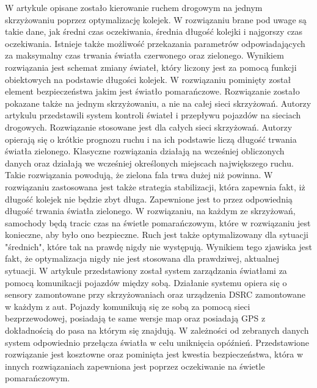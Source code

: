 \newline
\indent
W artykule \cite{de1998optimal} opisane zostało kierowanie ruchem drogowym na jednym skrzyżowaniu poprzez optymalizację kolejek. W rozwiązaniu brane pod uwage są takie dane, jak średni czas oczekiwania, średnia długość kolejki i najgorszy czas oczekiwania. Istnieje także możliwość przekazania parametrów odpowiadających za maksymalny czas trwania światła czerwonego oraz zielonego. Wynikiem rozwiązania jest schemat zmiany świateł, który liczony jest za pomocą funkcji obiektowych na podstawie długości kolejek. W rozwiązaniu pominięty został element bezpieczeństwa jakim jest światło pomarańczowe. Rozwiązanie zostało pokazane także na jednym skrzyżowaniu, a nie na całej sieci skrzyżowań.
\newline
\indent
  Autorzy artykulu \cite{lammer2008self} przedstawili system kontroli świateł i przepływu pojazdów na sieciach drogowych. Rozwiązanie stosowane jest dla całych sieci skrzyżowań. Autorzy opierają się o krótkie prognozu ruchu i na ich podstawie liczą długość trwania światła zielonego. Klasyczne rozwiązania działają na wcześniej obliczonych danych oraz działają we wcześniej określonych miejscach największego ruchu. Takie rozwiązania powodują, że zielona fala trwa dużej niż powinna. W rozwiązaniu zastosowana jest także strategia stabilizacji, która zapewnia fakt, iż długość kolejek nie będzie zbyt długa. Zapewnione jest to przez odpowiednią długość trwania światła zielonego. W rozwiązaniu, na każdym ze skrzyżowań, samochody będą tracic czas na świetle pomarańczowym, które w rozwiązaniu jest konieczne, aby było ono bezpieczne. Ruch jest także optymalizowany dla sytuacji "średnich", które tak na prawdę nigdy nie występują. Wynikiem tego zjawiska jest fakt, że optymalizacja nigdy nie jest stosowana dla prawdziwej, aktualnej sytuacji.
\newline
\indent
W artykule \cite{ferreira2010self} przedstawiony został system zarządzania światłami za pomocą komunikacji pojazdów między sobą. Działanie systemu opiera się o sensory zamontowane przy skrzyżowaniach oraz urządzenia DSRC zamontowane w każdym z aut. Pojazdy komunikują się ze sobą za pomocą sieci bezprzewodowej, posiadają te same wersje map oraz posiadają GPS z dokładnością do pasa na którym się znajdują. W zależności od zebranych danych system odpowiednio przełącza światła w celu uniknięcia opóźnień. Przedstawione rozwiązanie jest kosztowne oraz pominięta jest kwestia bezpieczeństwa, która w innych rozwiązaniach zapewniona jest poprzez oczekiwanie na świetle pomarańczowym.
    
